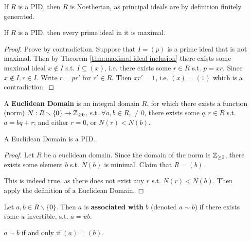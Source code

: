 \documentclass{article}
\begin{document}
\begin{remark}
    If $R$ is a PID, then $R$ is Noetherian, as principal ideals are by definition finitely generated.
\end{remark}

\begin{proposition}\label{prop:PID prime is maximal}
    If $R$ is a PID, then every prime ideal in it is maximal.
\end{proposition}

\begin{proof}
    Prove by contradiction. Suppose that $I = (p)$ is a prime ideal that is not maximal. Then by Theorem \ref{thm:maximal ideal inclusion} there exists some maximal ideal $x\notin I$ s.t. $I \subseteq (x)$, i.e. there exists some $r\in R$ s.t. $p = xr$. Since $x\notin I, r\in I$. Write $r = pr'$ for $r'\in R$. Then $xr'=1$, i.e. $(x) = (1)$ which is a contradiction.
\end{proof}

\begin{definition}
    A \textbf{Euclidean Domain} is an integral domain $R$, for which there exists a function (norm) $N: R\smallsetminus\{0\} \to \mathbb{Z}_{\geq 0}$, s.t. $\forall a, b\in R, \neq 0$, there exists some $q, r\in R$ s.t. $a = bq + r$; and either $r = 0$, or $N(r) < N(b)$.
\end{definition}

\begin{proposition}\label{prop:Euclidean Domain is PID}
    A Euclidean Domain is a PID.
\end{proposition}

\begin{proof}
    Let $R$ be a euclidean domain. Since the domain of the norm is $\mathbb{Z}_{\geq 0}$, there exists some element $b$ s.t. $N(b)$ is minimal. Claim that $R = (b)$.

    This is indeed true, as there does not exist any $r$ s.t. $N(r) < N(b)$. Then apply the definition of a Euclidean Domain.
\end{proof}

\begin{definition}
    Let $a, b\in R\smallsetminus\{0\}$. Then $a$ is \textbf{associated with} $b$ (denoted $a \sim b$) if there exists some $u$ invertible, s.t. $a = ub$.
\end{definition}

\begin{remark}
    $a \sim b$ if and only if $(a) = (b)$.
\end{remark}
\end{document}
